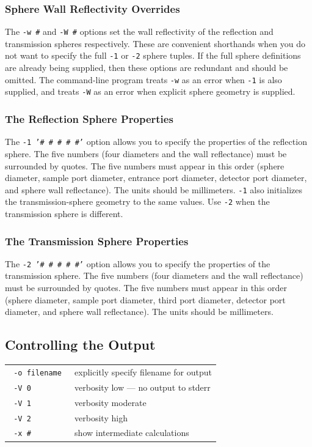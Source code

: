 \documentclass{article}
\begin{document}
\subsubsection{Sphere Wall Reflectivity Overrides}
The \texttt{-w \#} and \texttt{-W \#} options set the wall reflectivity of the
reflection and transmission spheres respectively.  These are convenient shorthands
when you do not want to specify the full \texttt{-1} or \texttt{-2} sphere tuples.
If the full sphere definitions are already being supplied, then these options are
redundant and should be omitted.  The command-line program treats \texttt{-w}
as an error when \texttt{-1} is also supplied, and treats \texttt{-W} as an
error when explicit sphere geometry is supplied.

\subsubsection{The Reflection Sphere Properties}
The \texttt{-1 '\# \# \# \# \#'} option allows you to specify the properties
of the reflection sphere. The five numbers (four diameters and the wall reflectance)
must be surrounded by quotes.  The 
five numbers must appear in this order (sphere diameter, sample port diameter,
entrance port diameter, detector port diameter, and sphere wall reflectance).
The units should be millimeters.  \texttt{-1} also initializes the transmission-sphere geometry to the same
values.  Use \texttt{-2} when the transmission sphere is different.

\subsubsection{The Transmission Sphere Properties}
The \texttt{-2 '\# \# \# \# \#'} option allows you to specify the properties
of the transmission sphere. The five numbers (four diameters and the wall reflectance)
must be surrounded by quotes.  The 
five numbers must appear in this order (sphere diameter, sample port diameter,
third port diameter, detector port diameter, and sphere wall reflectance).
The units should be millimeters.
\clearpage


\subsection{Controlling the Output}
\begin{center}
\begin{tabular}{lp{7cm}}
\texttt{ -o filename         }& explicitly specify filename for output     \\
\texttt{ -V 0                }& verbosity low --- no output to stderr      \\
\texttt{ -V 1                }& verbosity moderate                         \\
\texttt{ -V 2                }& verbosity high                             \\
\texttt{ -x \#               }& show intermediate calculations             \\
\end{tabular}
\end{center}
\end{document}
